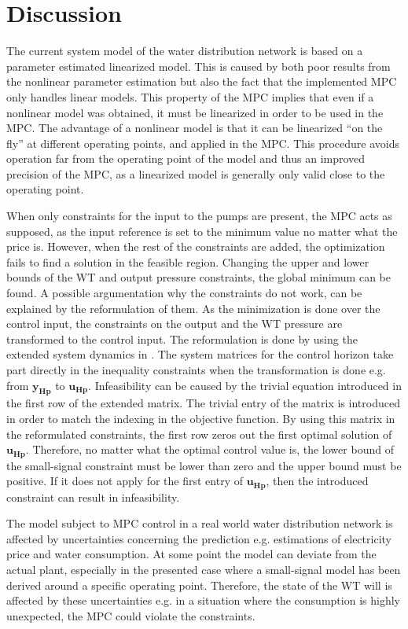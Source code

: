 \chapter{Discussion}
\label{Discussion}

The current system model of the water distribution network is based on a parameter estimated linearized model. This is caused by both poor results from the nonlinear parameter estimation but also the fact that the implemented MPC only handles linear models. This property of the MPC implies that even if a nonlinear model was obtained, it must be linearized in order to be used in the MPC. The advantage of a nonlinear model is that it can be linearized ``on the fly'' at different operating points, and applied in the MPC. This procedure avoids operation far from the operating point of the model and thus an improved precision of the MPC, as a linearized model is generally only valid close to the operating point.    

When only constraints for the input to the pumps are present, the MPC acts as supposed, as the input reference is set to the minimum value no matter what the price is. However, when the rest of the constraints are added, the optimization fails to find a solution in the feasible region. Changing the upper and lower bounds of the WT and output pressure constraints, the global minimum can be found. 
A possible argumentation why the constraints do not work, can be explained by the reformulation of them. As the minimization is done over the control input, the constraints on the output and the WT pressure are transformed to the control input. The reformulation is done by using the extended system dynamics in . The system matrices for the control horizon take part directly in the inequality constraints when the transformation is done e.g. from $\bm{y_{Hp}}$ to $\bm{u_{Hp}}$. Infeasibility can be caused by the trivial equation introduced in the first row of the extended matrix. The trivial entry of the matrix is introduced in order to match the indexing in the objective function. By using this matrix in the reformulated constraints, the first row zeros out the first optimal solution of $\bm{u_{Hp}}$. Therefore, no matter what the optimal control value is, the lower bound of the small-signal constraint must be lower than zero and the upper bound must be positive. If it does not apply for the first entry of $\bm{u_{Hp}}$, then the introduced constraint can result in infeasibility. 

The model subject to MPC control in a real world water distribution network is affected by uncertainties concerning the prediction e.g. estimations of electricity price and water consumption. At some point the model can deviate from the actual plant, especially in the presented case where a small-signal model has been derived around a specific operating point. Therefore, the state of the WT will is affected by these uncertainties e.g. in a situation where the consumption is highly unexpected, the MPC could violate the constraints.

